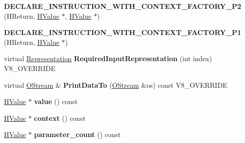 \begin{DoxyCompactItemize}
\item 
\hypertarget{classv8_1_1internal_1_1_v8___f_i_n_a_l_a95a64af9cf7f37a72122be059af5b92c}{}{\bfseries D\+E\+C\+L\+A\+R\+E\+\_\+\+I\+N\+S\+T\+R\+U\+C\+T\+I\+O\+N\+\_\+\+W\+I\+T\+H\+\_\+\+C\+O\+N\+T\+E\+X\+T\+\_\+\+F\+A\+C\+T\+O\+R\+Y\+\_\+\+P2} (H\+Return, \hyperlink{classv8_1_1internal_1_1_h_value}{H\+Value} $\ast$, \hyperlink{classv8_1_1internal_1_1_h_value}{H\+Value} $\ast$)\label{classv8_1_1internal_1_1_v8___f_i_n_a_l_a95a64af9cf7f37a72122be059af5b92c}

\item 
\hypertarget{classv8_1_1internal_1_1_v8___f_i_n_a_l_ac9c40dcf222be245e2cff85eb4c6bdd6}{}{\bfseries D\+E\+C\+L\+A\+R\+E\+\_\+\+I\+N\+S\+T\+R\+U\+C\+T\+I\+O\+N\+\_\+\+W\+I\+T\+H\+\_\+\+C\+O\+N\+T\+E\+X\+T\+\_\+\+F\+A\+C\+T\+O\+R\+Y\+\_\+\+P1} (H\+Return, \hyperlink{classv8_1_1internal_1_1_h_value}{H\+Value} $\ast$)\label{classv8_1_1internal_1_1_v8___f_i_n_a_l_ac9c40dcf222be245e2cff85eb4c6bdd6}

\item 
\hypertarget{classv8_1_1internal_1_1_v8___f_i_n_a_l_a6c6d1f37f40b113d8f4062f1ffff7215}{}virtual \hyperlink{classv8_1_1internal_1_1_representation}{Representation} {\bfseries Required\+Input\+Representation} (int index) V8\+\_\+\+O\+V\+E\+R\+R\+I\+D\+E\label{classv8_1_1internal_1_1_v8___f_i_n_a_l_a6c6d1f37f40b113d8f4062f1ffff7215}

\item 
\hypertarget{classv8_1_1internal_1_1_v8___f_i_n_a_l_ac450dad970b14246be761ccf5004924b}{}virtual \hyperlink{classv8_1_1internal_1_1_o_stream}{O\+Stream} \& {\bfseries Print\+Data\+To} (\hyperlink{classv8_1_1internal_1_1_o_stream}{O\+Stream} \&os) const V8\+\_\+\+O\+V\+E\+R\+R\+I\+D\+E\label{classv8_1_1internal_1_1_v8___f_i_n_a_l_ac450dad970b14246be761ccf5004924b}

\item 
\hypertarget{classv8_1_1internal_1_1_v8___f_i_n_a_l_a998b3feae0e84bbe080297551603911f}{}\hyperlink{classv8_1_1internal_1_1_h_value}{H\+Value} $\ast$ {\bfseries value} () const \label{classv8_1_1internal_1_1_v8___f_i_n_a_l_a998b3feae0e84bbe080297551603911f}

\item 
\hypertarget{classv8_1_1internal_1_1_v8___f_i_n_a_l_a8294bece2df148267ec52228e2139030}{}\hyperlink{classv8_1_1internal_1_1_h_value}{H\+Value} $\ast$ {\bfseries context} () const \label{classv8_1_1internal_1_1_v8___f_i_n_a_l_a8294bece2df148267ec52228e2139030}

\item 
\hypertarget{classv8_1_1internal_1_1_v8___f_i_n_a_l_a9f6a889f2c7ca7253e496e85c441e251}{}\hyperlink{classv8_1_1internal_1_1_h_value}{H\+Value} $\ast$ {\bfseries parameter\+\_\+count} () const \label{classv8_1_1internal_1_1_v8___f_i_n_a_l_a9f6a889f2c7ca7253e496e85c441e251}


\end{DoxyCompactItemize}
